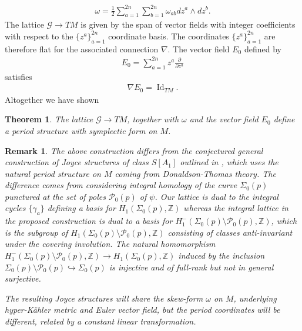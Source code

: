 \documentclass[a4paper,12pt,reqno]{amsart}
\newcounter{counter2}
\numberwithin{equation}{section}
\numberwithin{counter2}{section}
\newcounter{counter3}
\newtheorem{thm}[counter2]{Theorem}
\newtheorem{rem}[counter2]{Remark}
\begin{document}
\begin{align}
\omega =  \frac{1}{2}\sum_{a=1}^{2n} \sum_{b=1}^{2n} \omega_{ab}dz^{a} \wedge dz^{b}.  
\end{align}
The lattice $\mathcal{G} \to TM$ is given by the span of vector fields with integer coefficients with respect to the $\{z^{a}\}_{a=1}^{2n}$ coordinate basis.  The coordinates $\{z^{a}\}_{a=1}^{2n}$ are therefore flat for the associated connection $\nabla$.  The vector field $E_0$ defined by
\begin{align}
E_0 = \sum_{a=1}^{2n} z^{a}\frac{\partial}{\partial z^{a}} 
\end{align}
satisfies
\begin{align}
\nabla E_0 = \operatorname{Id}_{TM}.  
\end{align}
Altogether we have shown
\begin{thm}
The lattice $\mathcal{G}\to TM$,  together with $\omega$ and the vector field $E_0$ define a period structure with symplectic form on $M$.  
\end{thm}
\begin{rem}
The above construction differs from the conjectured general construction of Joyce structures of class $S[A_1]$ outlined in \cite{BdM},  which uses the natural period structure on $M$ coming from Donaldson-Thomas theory.  The difference comes from considering integral homology of the curve $\Sigma_0(p)$ punctured at the set of poles $\mathcal{P}_0(p)$ of $\psi$. Our lattice is dual to the integral cycles $\{\gamma_{a}\}$ defining a basis for $H_1(\Sigma_0(p),\mathbb{Z})$ whereas the integral lattice in the proposed construction is dual to a basis for $H_1^{-}(\Sigma_0(p) \setminus \mathcal{P}_0(p),\mathbb{Z})$,  which is the subgroup of $H_1(\Sigma_0(p) \setminus \mathcal{P}_0(p),\mathbb{Z})$ consisting of classes anti-invariant under the covering involution.  The natural homomorphism $H_1^{-}(\Sigma_0(p) \setminus \mathcal{P}_0(p),\mathbb{Z}) \to H_1(\Sigma_0(p),\mathbb{Z})$ induced by the inclusion $\Sigma_0(p) \setminus \mathcal{P}_0(p) \hookrightarrow \Sigma_0(p)$ is injective and of full-rank but not in general surjective.  \par 
The resulting Joyce structures will share the skew-form $\omega$ on $M$,  underlying hyper-K\"ahler metric and Euler vector field,  but the period coordinates will be different,  related by a constant linear transformation.  
\end{rem}
\end{document}
